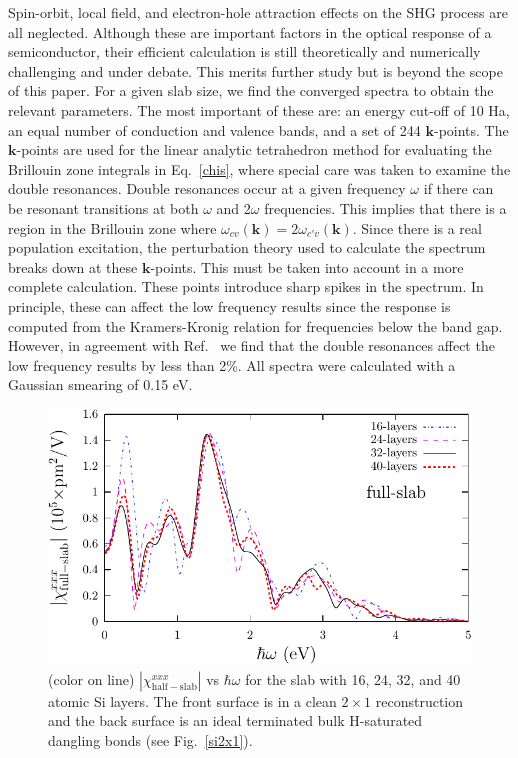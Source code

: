 \documentclass[floatfix,prb,aps,superscriptaddress,showpacs,11pt,preprint,letterpaper]{revtex4}
\begin{document}
Spin-orbit, local field, and electron-hole 
attraction\cite{beyond}
effects on the SHG process are all neglected.
Although these are important factors in the optical response of a semiconductor,
their efficient calculation is still theoretically and  
numerically challenging and  
under debate. This merits further study but is beyond the scope of this paper.
For a given slab size, we find the converged spectra 
to obtain the relevant parameters. The most important of 
these are: an energy cut-off of 10 Ha, an equal number of conduction and 
valence bands, and a set of 244 $\mathbf{k}$-points.
The $\mathbf{k}$-points are used for the linear analytic 
tetrahedron method for evaluating the
Brillouin zone integrals in Eq.~\eqref{chis}, 
where special care was taken to examine the double resonances.\cite{nastosPRB05}
Double resonances occur at a given frequency $\omega$ if there can be 
resonant transitions at both $\omega$ and 2$\omega$ frequencies. This 
implies that there is a region in the Brillouin zone where 
$\omega_{cv}(\mathbf{k})=2 \omega_{c'v}(\mathbf{k})$. Since there is a real population 
excitation, the perturbation theory used to calculate the spectrum breaks 
down at these $\mathbf{k}$-points. This must be taken into account in a more 
complete calculation. These points introduce sharp spikes in the spectrum. 
In principle, these can affect the low frequency results since the response 
is computed from the Kramers-Kronig relation for frequencies below the band 
gap. However, in agreement with Ref.~ we find that 
the double resonances affect the low frequency results by less than 2\%. 
All spectra were calculated with a Gaussian smearing of 0.15 eV.
\begin{figure}
\centering 
\includegraphics[scale=.8]{plots/fig1}
\caption{(color on line) 
$|\chi_{\mathrm{half-slab}}^{xxx}|$ vs $\hbar\omega$ 
for the slab
with 16, 24, 32, and 40 atomic Si layers. The front surface 
is in a clean $2\times 1$ reconstruction and the back 
surface is an ideal terminated bulk H-saturated dangling bonds (see Fig.~\ref{si2x1}).
\label{fig1}} 
\end{figure}
\end{document}
